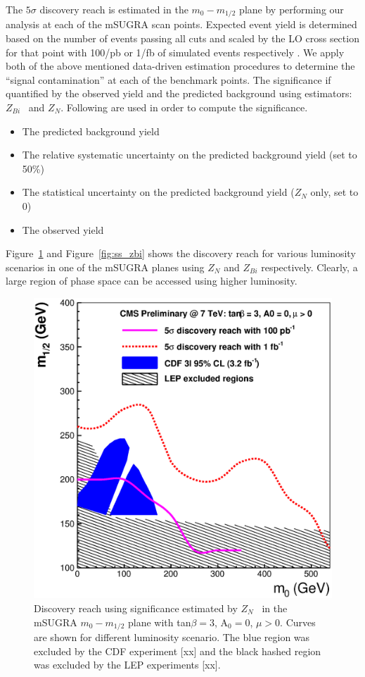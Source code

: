The $5\sigma$  discovery reach is estimated in the $m_{0}-m_{1/2}$
plane by  performing our analysis at each of the  mSUGRA scan points.
Expected event yield is determined based on the number of events passing
all cuts and scaled by the LO cross section for that point with 100/pb or 1/fb
of simulated events respectively . We apply both of the above mentioned data-driven 
estimation procedures to determine the ``signal contamination'' at each of the benchmark points. 
The significance if quantified by the observed yield and the predicted background
using estimators: $Z_{Bi}$~\cite{cite:cousins}  and $Z_{N}$\cite{cite:conway}. Following
are used in order to compute the significance.
\begin{itemize}
\item The predicted background yield
\item The relative systematic  uncertainty on the predicted background
yield (set to 50\%)
\item The  statistical uncertainty  on the predicted  background yield
($Z_N$ only, set to 0)
\item The observed yield
\end{itemize}
Figure~\ref{fig:ss_zn} and Figure~\ref{fig:ss_zbi} shows the discovery reach for various 
luminosity scenarios in one of the mSUGRA planes using $Z_{N}$ and $Z_{Bi}$ respectively.
Clearly, a large region of phase space can be accessed using higher luminosity. 
\vspace{3 mm}
\begin{figure}[htb]
\begin{center}
\includegraphics[width=0.7\linewidth]{figs/massreachss_zn.eps}
\caption{Discovery reach using significance estimated by $Z_N$~\cite{cite:conway} 
in the mSUGRA $m_{0}-m_{1/2}$ plane with tan$\beta = 3$, A$_0 = 0$, $\mu > 0$. 
Curves are shown for different luminosity scenario. The blue region was excluded by 
the CDF experiment [xx] and the black hashed region was excluded by the LEP 
experiments [xx].\label{fig:ss_zn}}
\end{center}
\end{figure}
